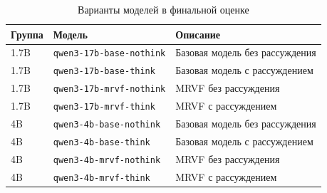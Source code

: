 \begin{table}[h]
    \centering
    \caption{Варианты моделей в финальной оценке}
    \label{tab:appendix-model-variants}
    \begin{tabular}{lll}
        \hline
        Группа & Модель                          & Описание                       \\
        \hline
        1.7B   & \texttt{qwen3-17b-base-nothink} & Базовая модель без рассуждения \\
        1.7B   & \texttt{qwen3-17b-base-think}   & Базовая модель с рассуждением  \\
        1.7B   & \texttt{qwen3-17b-mrvf-nothink} & MRVF без рассуждения           \\
        1.7B   & \texttt{qwen3-17b-mrvf-think}   & MRVF с рассуждением            \\
        4B     & \texttt{qwen3-4b-base-nothink}  & Базовая модель без рассуждения \\
        4B     & \texttt{qwen3-4b-base-think}    & Базовая модель с рассуждением  \\
        4B     & \texttt{qwen3-4b-mrvf-nothink}  & MRVF без рассуждения           \\
        4B     & \texttt{qwen3-4b-mrvf-think}    & MRVF с рассуждением            \\
        \hline
    \end{tabular}
\end{table}
